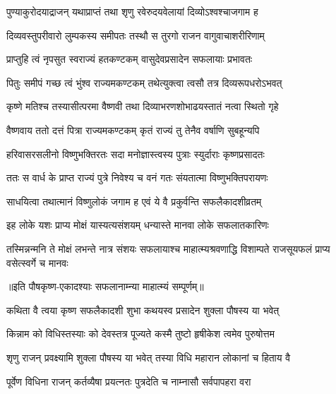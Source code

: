 \twolineshloka
{पुण्याकुरोदयाद्राजन् यथाप्राप्तं तथा शृणु}
{रवेरुदयवेलायां दिव्योऽश्वश्चाजगाम ह} %

\twolineshloka
{दिव्यवस्तुपरीवारो लुम्पकस्य समीपतः}
{तस्थौ स तुरगो राजन वागुवाचाशरीरिणाम्} %

\twolineshloka
{प्राप्तुहि त्वं नृपसुत स्वराज्यं हतकण्टकम्}
{वासुदेवप्रसादेन सफलायाः प्रभावतः} %

\twolineshloka
{पितुः समीपं गच्छ त्वं भुंश्व राज्यमकण्टकम्}
{तथेत्युक्त्वा त्वसौ तत्र दिव्यरूपधरोऽभवत्} %

\twolineshloka
{कृष्णे मतिश्च तस्यासीत्परमा वैष्णवी तथा}
{दिव्याभरणशोभाढयस्तातं नत्वा स्थितो गृहे} %

\twolineshloka
{वैष्णवाय ततो दत्तं पित्रा राज्यमकण्टकम्}
{कृतं राज्यं तु तेनैव वर्षाणि सुबहून्यपि} %

\twolineshloka
{हरिवासरसलीनो विष्णुभक्तिरतः सदा}
{मनोज्ञास्त्वस्य पुत्राः स्युर्दाराः कृष्णप्रसादतः} %

\twolineshloka
{ततः स वार्ध के प्राप्त राज्यं पुत्रे निवेश्य च}
{वनं गतः संयतात्मा विष्णुभक्तिपरायणः} %

\twolineshloka
{साधयित्वा तथात्मानं विष्णुलोकं जगाम ह}
{एवं ये वै प्रकुर्वन्ति सफलैकादशीव्रतम्} %

\twolineshloka
{इह लोके यशः प्राप्य मोक्षं यास्यत्यसंशयम्}
{धन्यास्ते मानवा लोके सफलातकारिणः} %


\threelineshloka
{तस्मिन्नन्मनि ते मोक्षं लभन्ते नात्र संशयः}
{सफलायाश्च माहात्म्यश्रवणाद्धि विशाम्पते}
{राजसूयफलं प्राप्य वसेत्स्वर्गे च मानवः} %

॥इति पौषकृष्ण-एकादश्याः सफलानाम्न्या माहात्म्यं सम्पूर्णम्॥


\hyperref[sec:ekadashi_mahatmyam_vrata_raja]{\closesub}
\clearpage

\label{sec:vrata-raja-pausha-shukla-putrada}


\twolineshloka
{कथिता वै त्वया कृष्ण सफलैकादशी शुभा}
{कथयस्व प्रसादेन शुक्ला पौषस्य या भवेत्} %

\twolineshloka
{किन्नाम को विधिस्तस्याः को देवस्तत्र पूज्यते}
{कस्मै तुष्टो हृषीकेश त्वमेव पुरुषोत्तम} %


\twolineshloka
{शृणु राजन् प्रवक्ष्यामि शुक्ला पौषस्य या भवेत्}
{तस्या विधि महारान लोकानां च हिताय वै} %

\twolineshloka
{पूर्वेण विधिना राजन् कर्तव्यैषा प्रयत्नतः}
{पुत्रदेति च नाम्नासौ सर्वपापहरा वरा} %

